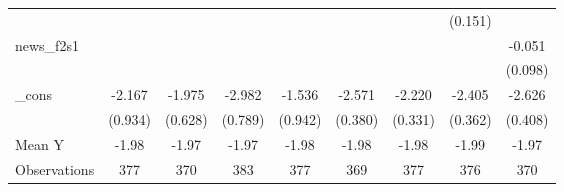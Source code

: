 {\begin{tabular}{l*{8}{c}}
            &                     &                     &                     &                     &                     &                     &     (0.151)         &                     \\
\addlinespace
news\_f2s1   &                     &                     &                     &                     &                     &                     &                     &      -0.051         \\
            &                     &                     &                     &                     &                     &                     &                     &     (0.098)         \\
\addlinespace
\_cons      &      -2.167\sym{**} &      -1.975\sym{***}&      -2.982\sym{***}&      -1.536         &      -2.571\sym{***}&      -2.220\sym{***}&      -2.405\sym{***}&      -2.626\sym{***}\\
            &     (0.934)         &     (0.628)         &     (0.789)         &     (0.942)         &     (0.380)         &     (0.331)         &     (0.362)         &     (0.408)         \\
\midrule
Mean Y      &       -1.98         &       -1.97         &       -1.97         &       -1.98         &       -1.98         &       -1.98         &       -1.99         &       -1.97         \\
Observations&         377         &         370         &         383         &         377         &         369         &         377         &         376         &         370         \\
\bottomrule
\end{tabular}
}
